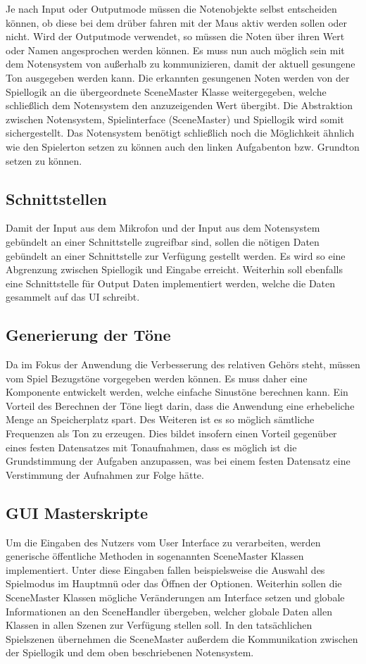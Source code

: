 Je nach Input oder Outputmode müssen die Notenobjekte selbst entscheiden können, ob diese bei dem drüber fahren mit der Maus aktiv werden sollen oder nicht. Wird der Outputmode verwendet, so müssen die Noten über ihren Wert oder Namen angesprochen werden können. Es muss nun auch möglich sein mit dem Notensystem von außerhalb zu kommunizieren, damit der aktuell gesungene Ton ausgegeben werden kann. Die erkannten gesungenen Noten werden von der Spiellogik an die übergeordnete SceneMaster Klasse weitergegeben, welche schließlich dem Notensystem den anzuzeigenden Wert übergibt. Die Abstraktion zwischen Notensystem, Spielinterface (SceneMaster) und Spiellogik wird somit sichergestellt.
Das Notensystem benötigt schließlich noch die Möglichkeit ähnlich wie den Spielerton setzen zu können auch den linken Aufgabenton bzw. Grundton setzen zu können.\\

\subsection{Schnittstellen}
Damit der Input aus dem Mikrofon und der Input aus dem Notensystem gebündelt an einer Schnittstelle zugreifbar sind, sollen die nötigen Daten gebündelt an einer Schnittstelle zur Verfügung gestellt werden. Es wird so eine Abgrenzung zwischen Spiellogik und Eingabe erreicht. Weiterhin soll ebenfalls eine Schnittstelle für Output Daten implementiert werden, welche die Daten gesammelt auf das UI schreibt.

\subsection{Generierung der Töne}
Da im Fokus der Anwendung die Verbesserung des relativen Gehörs steht, müssen vom Spiel Bezugstöne vorgegeben werden können. Es muss daher eine Komponente entwickelt werden, welche einfache Sinustöne berechnen kann. Ein Vorteil des Berechnen der Töne liegt darin, dass die Anwendung eine erhebeliche Menge an Speicherplatz spart. Des Weiteren ist es so möglich sämtliche Frequenzen als Ton zu erzeugen. Dies bildet insofern einen Vorteil gegenüber eines festen Datensatzes mit Tonaufnahmen, dass es möglich ist die Grundstimmung der Aufgaben anzupassen, was bei einem festen Datensatz eine Verstimmung der Aufnahmen zur Folge hätte. 

\subsection{GUI Masterskripte}
Um die Eingaben des Nutzers vom User Interface zu verarbeiten, werden generische öffentliche Methoden in sogenannten SceneMaster Klassen implementiert. Unter diese Eingaben fallen beispielsweise die Auswahl des Spielmodus im Hauptmnü oder das Öffnen der Optionen. Weiterhin sollen die SceneMaster Klassen mögliche Veränderungen am Interface setzen und globale Informationen an den SceneHandler übergeben, welcher globale Daten allen Klassen in allen Szenen zur Verfügung stellen soll. In den tatsächlichen Spielszenen übernehmen die SceneMaster außerdem die Kommunikation zwischen der Spiellogik und dem oben beschriebenen Notensystem.

